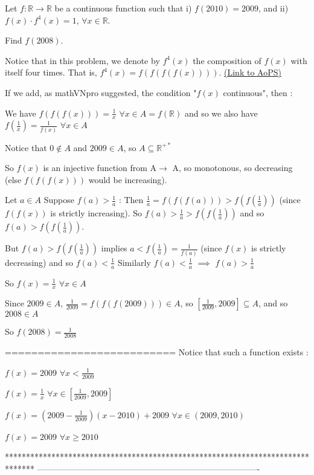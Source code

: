 \begin{problem}
	Let $ f: \mathbb R\longrightarrow \mathbb R$ be a continuous function such that
i) $ f(2010)=2009$, and
ii) $ f(x)\cdot f^{4}(x)=1$, $ \forall x\in \mathbb R$.

Find $ f(2008)$. 

Notice that in this problem, we denote by $f^4(x)$ the composition of $f(x)$ with itself four times. That is, $f^4(x)=f(f(f(f(x))))$.
	\flushright \href{https://artofproblemsolving.com/community/c6h239200}{(Link to AoPS)}
\end{problem}



\begin{solution}
	If we add, as mathVNpro suggested, the condition "$ f(x)$ continuous", then :

We have $ f(f(f(x)))=\frac{1}{x}$ $ \forall x\in A=f(\mathbb R)$ and so we also have $ f(\frac{1}{x})=\frac{1}{f(x)}$ $ \forall x\in A$

Notice that $ 0\notin A$ and $ 2009\in A$, so $ A\subseteq\mathbb R^{+*}$

So $ f(x)$ is an injective function from A$ \to$ A, so monotonous, so decreasing (else $ f(f(f(x)))$ would be increasing).

Let $ a\in A$
Suppose $ f(a)>\frac{1}{a}$ : Then $ \frac{1}{a}=f(f(f(a)))>f(f(\frac{1}{a}))$ (since $ f(f(x))$ is strictly increasing). So  $ f(a)>\frac{1}{a}>f(f(\frac{1}{a}))$  and so $ f(a)>f(f(\frac{1}{a}))$.

But $ f(a)>f(f(\frac{1}{a}))$ implies $ a<f(\frac{1}{a})=\frac{1}{f(a)}$ (since $ f(x)$ is strictly decreasing) and so $ f(a)<\frac{1}{a}$
Similarly $ f(a)<\frac{1}{a}$ $ \implies$ $ f(a)>\frac{1}{a}$

So $ f(x)=\frac{1}{x}$ $ \forall x\in A$

Since $ 2009\in A$, $ \frac{1}{2009}=f(f(f(2009)))\in A$, so $ [\frac{1}{2009},2009]\subseteq A$, and so $ 2008\in A$

So $ f(2008)=\frac{1}{2008}$

==========================
Notice that such a function exists :

$ f(x)=2009$ $ \forall x< \frac{1}{2009}$

$ f(x)=\frac{1}{x}$ $ \forall x\in[\frac{1}{2009},2009]$

$ f(x)=(2009-\frac{1}{2009})(x-2010)+2009$ $ \forall x\in(2009,2010)$

$ f(x)=2009$ $ \forall x\geq 2010$
\end{solution}
*******************************************************************************
-------------------------------------------------------------------------------

